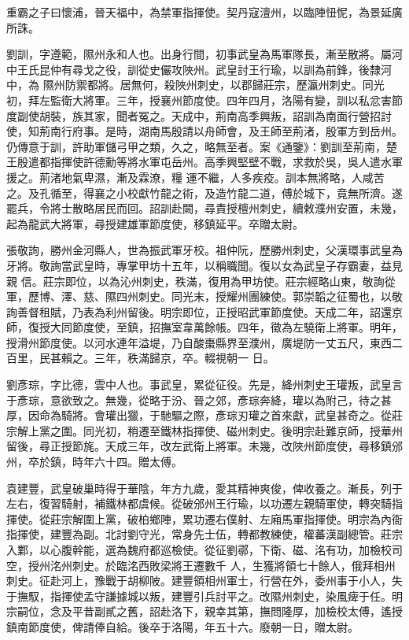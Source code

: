 \begin{pinyinscope}
 重霸之子曰懷浦，晉天福中，為禁軍指揮使。契丹寇澶州，以臨陣忸怩，為景延廣所誅。



 劉訓，字遵範，隰州永和人也。出身行間，初事武皇為馬軍隊長，漸至散將。屬河中王氏昆仲有尋戈之役，訓從史儼攻陜州。武皇討王行瑜，以訓為前鋒，後隸河中，為
 隰州防禦都將。居無何，殺陜州刺史，以郡歸莊宗，歷瀛州刺史。同光初，拜左監衛大將軍。三年，授襄州節度使。四年四月，洛陽有變，訓以私忿害節度副使胡裝，族其家，聞者冤之。天成中，荊南高季興叛，詔訓為南面行營招討使，知荊南行府事。是時，湖南馬殷請以舟師會，及王師至荊渚，殷軍方到岳州。仍傳意于訓，許助軍儲弓甲之類，久之，略無至者。案《通鑒》：劉訓至荊南，楚王殷遣都指揮使許德勳等將水軍屯岳州。高季興堅壁不戰，求救於吳，吳人遣水軍援之。荊渚地氣卑濕，漸及霖潦，糧
 運不繼，人多疾疫。訓本無將略，人咸苦之。及孔循至，得襄之小校獻竹龍之術，及造竹龍二道，傅於城下，竟無所濟。遂罷兵，令將士散略居民而回。詔訓赴闕，尋責授檀州刺史，續敕濮州安置，未幾，起為龍武大將軍，尋授建雄軍節度使，移鎮延平。卒贈太尉。



 張敬詢，勝州金河縣人，世為振武軍牙校。祖仲阮，歷勝州刺史，父漢環事武皇為牙將。敬詢當武皇時，專掌甲坊十五年，以稱職聞。復以女為武皇子存霸妻，益見親
 信。莊宗即位，以為沁州刺史，秩滿，復用為甲坊使。莊宗經略山東，敬詢從軍，歷博、澤、慈、隰四州刺史。同光末，授耀州團練使。郭崇韜之征蜀也，以敬詢善督租賦，乃表為利州留後。明宗即位，正授昭武軍節度使。天成二年，詔還京師，復授大同節度使，至鎮，招撫室韋萬餘帳。四年，徵為左驍衛上將軍。明年，授滑州節度使。以河水連年溢堤，乃自酸棗縣界至濮州，廣堤防一丈五尺，東西二百里，民甚賴之。三年，秩滿歸京，卒。輟視朝一
 日。



 劉彥琮，字比德，雲中人也。事武皇，累從征役。先是，絳州刺史王瓘叛，武皇言于彥琮，意欲致之。無幾，從略于汾、晉之郊，彥琮奔絳，瓘以為附己，待之甚厚，因命為騎將。會瓘出獵，于馳驅之際，彥琮刃瓘之首來獻，武皇甚奇之。從莊宗解上黨之圍。同光初，稍遷至鐵林指揮使、磁州刺史。後明宗赴難京師，授華州留後，尋正授節旄。天成三年，改左武衛上將軍。未幾，改陜州節度使，尋移鎮邠州，卒於鎮，時年六十四。贈太傅。



 袁建豐，武皇破巢時得于華陰，年方九歲，愛其精神爽俊，俾收養之。漸長，列于左右，復習騎射，補鐵林都虞候。從破邠州王行瑜，以功遷左親騎軍使，轉突騎指揮使。從莊宗解圍上黨，破柏鄉陣，累功遷右僕射、左廂馬軍指揮使。明宗為內衙指揮使，建豐為副。北討劉守光，常身先士伍，轉都教練使，權蕃漢副總管。莊宗入鄴，以心腹幹能，選為魏府都巡檢使。從征劉鄩，下衛、磁、洺有功，加檢校司空，授州洺州刺史。於臨洺西敗梁將王遷數千
 人，生獲將領七十餘人，俄拜相州刺史。征赴河上，豫戰于胡柳陂。建豐領相州軍士，行營在外，委州事于小人，失于撫馭，指揮使孟守謙據城以叛，建豐引兵討平之。改隰州刺史，染風痺于任。明宗嗣位，念及平昔副貳之舊，詔赴洛下，親幸其第，撫問隆厚，加檢校太傅，遙授鎮南節度使，俾請俸自給。後卒于洛陽，年五十六。廢朝一日，贈太尉。




\end{pinyinscope}
